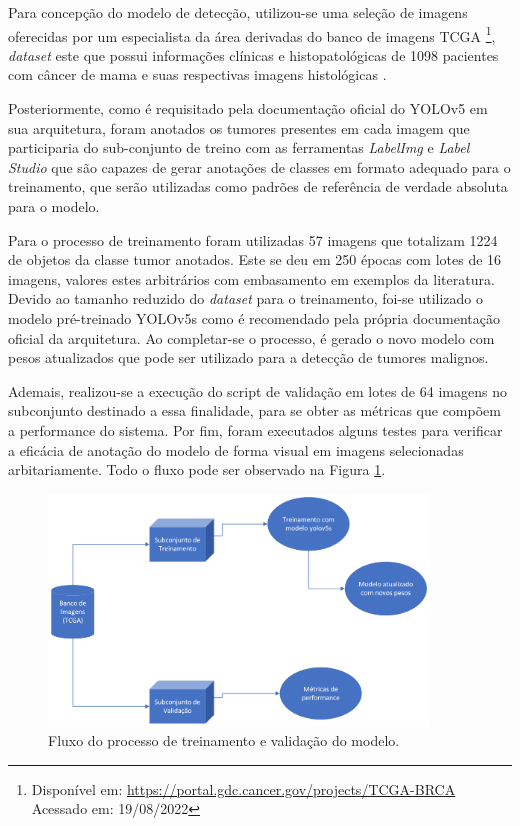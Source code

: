 \documentclass[12pt]{article}
\begin{document}
Para concepção do modelo de detecção, utilizou-se uma seleção de imagens oferecidas por um especialista da área derivadas do banco de imagens TCGA \footnote{Disponível em: \url{https://portal.gdc.cancer.gov/projects/TCGA-BRCA} Acessado em: 19/08/2022 }, {\it dataset} este que possui informações clínicas e histopatológicas de 1098 pacientes com câncer de mama e suas respectivas imagens histológicas \cite{tiezzi2020}.

Posteriormente, como é requisitado pela documentação oficial do YOLOv5 \cite{glenn_jocher_2022} em sua arquitetura, foram anotados os tumores presentes em cada imagem que participaria do sub-conjunto de treino com as ferramentas {\it LabelImg} \cite{tzutalin2015labelimg} e {\it Label Studio} \cite{labelStudio} que são capazes de gerar anotações de classes em formato adequado para o treinamento, que serão utilizadas como padrões de referência de verdade absoluta para o modelo.

Para o processo de treinamento foram utilizadas 57 imagens que totalizam 1224 de objetos da classe tumor anotados. Este se deu em 250 épocas com lotes de 16 imagens, valores estes arbitrários com embasamento em exemplos da literatura. Devido ao tamanho reduzido do {\it dataset} para o treinamento, foi-se utilizado o modelo pré-treinado YOLOv5s \cite{glenn_jocher_2022} como é recomendado pela própria documentação oficial da arquitetura. Ao completar-se o processo, é gerado o novo modelo com pesos atualizados que pode ser utilizado para a detecção de tumores malignos.

Ademais, realizou-se a execução do script de validação em lotes de 64 imagens no subconjunto destinado a essa finalidade, para se obter as métricas que compõem a performance do sistema. Por fim, foram executados alguns testes para verificar a eficácia de anotação do modelo de forma visual em imagens selecionadas arbitariamente. Todo o fluxo pode ser observado na Figura \ref{fig:methods}.

\begin{figure}[ht]
  \centering
  \includegraphics[width=0.9\textwidth]{images/methods.png}
  \caption{Fluxo do processo de treinamento e validação do modelo.}
  \label{fig:methods}
\end{figure}
\end{document}
